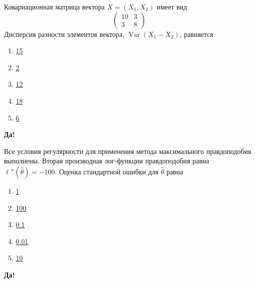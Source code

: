 \documentclass[t]{beamer}
\DeclareMathOperator{\Var}{Var}
\begin{document}
 \begin{frame} \label{48-Yes} 
\begin{block}{48} 

Ковариационная матрица вектора $X=(X_1,X_2)$ имеет вид
\[
\begin{pmatrix}
10 & 3 \\
3 & 8
\end{pmatrix}
\]
Дисперсия разности элементов вектора, $\Var(X_1-X_2)$, равняется
 


 \end{block} 
\begin{enumerate} 
\item[] \hyperlink{48-No}{\beamergotobutton{} 15}
\item[] \hyperlink{48-No}{\beamergotobutton{} 2}
\item[] \hyperlink{48-Yes}{\beamergotobutton{} 12}
\item[] \hyperlink{48-No}{\beamergotobutton{} 18}
\item[] \hyperlink{48-No}{\beamergotobutton{} 6}
\end{enumerate} 

 \textbf{Да!} 
 \hyperlink{49}{}\end{frame} 


 \begin{frame} \label{49-Yes} 
\begin{block}{49} 

Все условия регулярности для применения метода максимального правдоподобия выполнены. Вторая производная лог-функции правдоподобия равна $\ell''(\hat{\theta})=-100$. Оценка стандартной ошибки для $\hat{\theta}$ равна
 


 \end{block} 
\begin{enumerate} 
\item[] \hyperlink{49-No}{\beamergotobutton{} 1}
\item[] \hyperlink{49-No}{\beamergotobutton{} 100}
\item[] \hyperlink{49-Yes}{\beamergotobutton{} 0.1}
\item[] \hyperlink{49-No}{\beamergotobutton{} 0.01}
\item[] \hyperlink{49-No}{\beamergotobutton{} 10}
\end{enumerate} 

 \textbf{Да!} 
 \hyperlink{50}{}\end{frame} 
\end{document}
